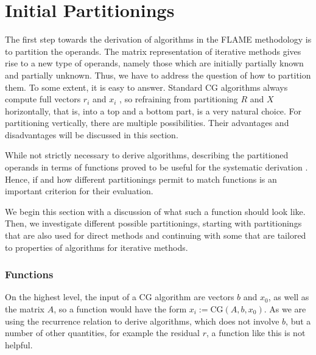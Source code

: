 \section{Initial Partitionings}
\label{sec:MatrixRepresentationPartitionings}

The first step towards the derivation of algorithms in the FLAME methodology is to partition the operands. The matrix representation of iterative methods gives rise to a new type of operands, namely those which are initially partially known and partially unknown. Thus, we have to address the question of how to partition them. To some extent, it is easy to answer. Standard CG algorithms always compute full vectors $r_i$ and $x_i$ \cite{barrett:templates, saad2000iterative, vanderVorst:book}, so refraining from partitioning $R$ and $X$ horizontally, that is, into a top and a bottom part, is a very natural choice. For partitioning vertically, there are multiple possibilities. Their advantages and disadvantages will be discussed in this section.

While not strictly necessary to derive algorithms, describing the partitioned op\-er\-ands in terms of functions proved to be useful for the systematic derivation \cite{Fabregat-Traver2011:54}. Hence, if and how different partitionings permit to match functions is an important criterion for their evaluation. %


We begin this section with a discussion of what such a function should look like. Then, we investigate different possible partitionings, starting with partitionings that are also used for direct methods and continuing with some that are tailored to properties of algorithms for iterative methods.

\subsubsection{Functions}

On the highest level, the input of a CG algorithm are vectors $b$ and $x_0$, as well as the matrix $A$, so a function would have the form $x_i :=  \text{CG}(A, b, x_0)$. As we are using the recurrence relation to derive algorithms, which does not involve $b$, but a number of other quantities, for example the residual $r$, a function like this is not helpful.

